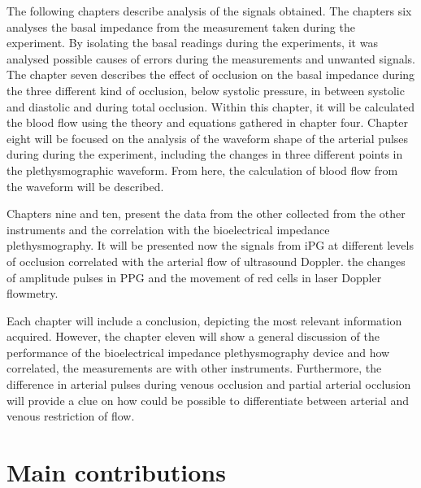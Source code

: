 The following chapters describe analysis of the signals obtained. The chapters six analyses the basal impedance from the measurement taken during the experiment. By isolating the basal readings during the experiments, it was analysed possible causes of errors during the measurements and unwanted signals. The chapter seven describes the effect of occlusion on the basal impedance during the three different kind of occlusion, below systolic pressure, in between systolic and diastolic and during total occlusion. Within this chapter, it will be calculated the blood flow using the theory and equations gathered in chapter four. Chapter eight will be focused on the analysis of the waveform shape of the arterial pulses during during the experiment, including the changes in three different points in the plethysmographic waveform. From here, the calculation of blood flow from the waveform will be described. 

Chapters nine and ten, present the data from the other collected from the other instruments and the correlation with the bioelectrical impedance plethysmography. It will be presented now the signals from iPG at different levels of occlusion correlated with the arterial flow of ultrasound Doppler. the changes of amplitude pulses in PPG and the movement of red cells in laser Doppler flowmetry. 

Each chapter will include a conclusion, depicting the most relevant information acquired. However, the chapter eleven will show a general discussion of the performance of the bioelectrical impedance plethysmography device and how correlated, the measurements are with other instruments. Furthermore, the difference in arterial pulses during venous occlusion and partial arterial occlusion will provide a clue on how could be possible to differentiate between arterial and venous restriction of flow. 

  

\section{Main contributions}
